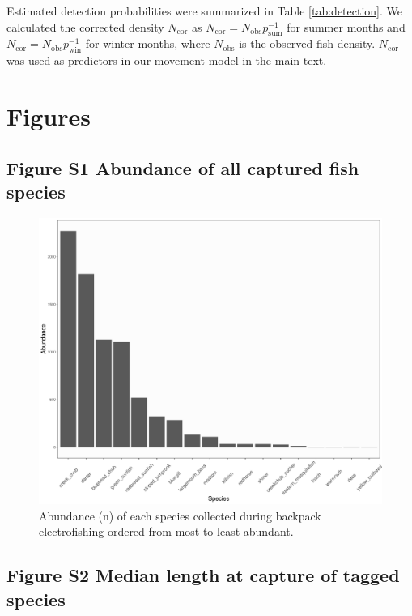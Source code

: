 \documentclass[11pt, class=article, crop=false]{standalone}
\begin{document}
Estimated detection probabilities were summarized in Table \ref{tab:detection}. We calculated the corrected density $N_{\text{cor}}$ as $N_{\text{cor}} = N_{\text{obs}}p_{\text{sum}}^{-1}$ for summer months and $N_{\text{cor}} = N_{\text{obs}}p_{\text{win}}^{-1}$ for winter months, where $N_{\text{obs}}$ is the observed fish density. $N_{\text{cor}}$ was used as predictors in our movement model in the main text.

\newpage

\section{Figures}

\subsection{Figure S1 Abundance of all captured fish species}

\begin{figure}
    \centering
    \includegraphics[width=0.9\linewidth]{output/fig_abundance.pdf}
    \caption{Abundance (n) of each species collected during backpack electrofishing ordered from most to least abundant.}
    \label{fig:fig_abundance}
\end{figure}

\newpage

\subsection{Figure S2 Median length at capture of tagged species}
\end{document}
